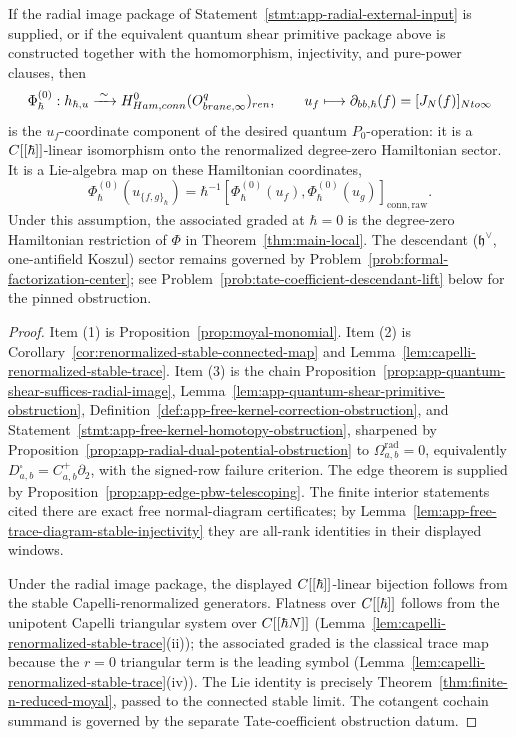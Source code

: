 \documentclass[11pt]{memoir}
\begin{document}
\begin{thm}
  If the radial image package of
  Statement~\ref{stmt:app-radial-external-input} is supplied, or if the
  equivalent quantum shear primitive package above is constructed
  together with the homomorphism, injectivity, and pure-power clauses,
  then
  $$\Phi_\hbar^{(0)}:h_{\hbar,u}
      \xrightarrow{\;\sim\;}
      H^0_{Ham,conn}
        (O^{q}_{brane,\infty})_{ren},
      \qquad
      u_f\longmapsto\partial_{bb,\hbar}(f)
       =[J_N(f)]_{Nto\infty}$$
  is the \(u_f\)-coordinate component of the desired quantum
  \(P_0\)-operation: it is a $C[[\hbar]]$-linear isomorphism onto the
  renormalized degree-zero Hamiltonian sector.  It is a Lie-algebra map on
  these Hamiltonian coordinates,
  $$\Phi_\hbar^{(0)}(u_{\{f,g\}_\hbar})
    =\hbar^{-1}[\Phi_\hbar^{(0)}(u_f),
      \Phi_\hbar^{(0)}(u_g)]_{\mathrm{conn,raw}}.$$
  Under this assumption, the associated graded at $\hbar=0$ is the degree-zero Hamiltonian
  restriction of $\Phi$ in Theorem~\ref{thm:main-local}. The descendant
  ($\mathfrak h^\vee$, one-antifield Koszul) sector remains governed by
  Problem~\ref{prob:formal-factorization-center}; see
  Problem~\ref{prob:tate-coefficient-descendant-lift} below for the pinned
  obstruction.
\end{thm}

\begin{proof}
  Item (1) is Proposition~\ref{prop:moyal-monomial}.  Item (2) is
  Corollary~\ref{cor:renormalized-stable-connected-map} and
  Lemma~\ref{lem:capelli-renormalized-stable-trace}.  Item (3) is the
  chain
  Proposition~\ref{prop:app-quantum-shear-suffices-radial-image},
  Lemma~\ref{lem:app-quantum-shear-primitive-obstruction},
  Definition~\ref{def:app-free-kernel-correction-obstruction}, and
  Statement~\ref{stmt:app-free-kernel-homotopy-obstruction}, sharpened by
  Proposition~\ref{prop:app-radial-dual-potential-obstruction} to
  \(\Omega^{\mathrm{rad}}_{a,b}=0\), equivalently
  \(D^\square_{a,b}=C^+_{a,b}\partial_2\), with the signed-row failure
  criterion.  The edge theorem is supplied by
  Proposition~\ref{prop:app-edge-pbw-telescoping}.  The finite interior
  statements cited there are exact free normal-diagram certificates; by
  Lemma~\ref{lem:app-free-trace-diagram-stable-injectivity} they are
  all-rank identities in their displayed windows.

  Under the radial image package, the displayed $C[[\hbar]]$-linear
  bijection follows from the stable Capelli-renormalized generators.
  Flatness over $C[[\hbar]]$ follows from the unipotent Capelli
  triangular system over $C[[\hbar N]]$
  (Lemma~\ref{lem:capelli-renormalized-stable-trace}(ii)); the
  associated graded is the classical trace map because the $r=0$
  triangular term is the leading symbol
  (Lemma~\ref{lem:capelli-renormalized-stable-trace}(iv)).  The Lie
  identity is precisely Theorem~\ref{thm:finite-n-reduced-moyal}, passed
  to the connected stable limit. The cotangent cochain summand is
  governed by the separate Tate-coefficient obstruction datum.
\end{proof}
\end{document}
